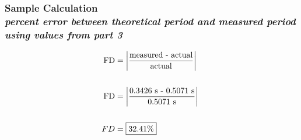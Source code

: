 \subsubsection{Sample Calculation \\ {\normalfont \small\textit{percent error between theoretical period and measured period using values from part 3}}}

\begin{align*}
	\text{FD}	&= \left| \frac{\text{measured - actual}}{\text{actual}} \right|\ \\ \\
	\text{FD}	&= \left| \frac{\text{0.3426\text{ s} - 0.5071\text{ s}}}{\text{0.5071\text{ s}}} \right|\ \\ \\
			FD &= \boxed{32.41\%} 
\end{align*}

%
%
%

